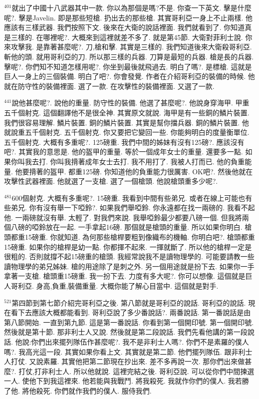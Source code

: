 \documentclass{book}
\begin{document}
$^{401}$就出了中國十八武器其中一款.
你以為那個是嗎?不是.
你查一下英文.
擊是什麼呢?.
擊是Javelin.
即是那些短槍.
扔出去的那些槍.
其實哥利亞一身上不止兩樣.
他應該有三樣武器.
我們按照下文.
後來在大衛的說話裡面.
我們就看到了.
你知道真是三樣的.
在哪裡呢?.
大概來到這裡就差不多了.
就是第45節.
大衛對菲利士說.
你來攻擊我.
是靠著甚麼呢?.
刀,槍和擊.
其實是三樣的.
我們知道後來大衛殺哥利亞.
斬他的頭.
就用哥利亞的刀.
所以那三樣的兵器.
刀算是最短的兵器.
槍是長的兵器.
擊呢?.
你們知不知道怎樣用呢?.
你坐到最後就飛過去.
明白了嗎?.
是標槍.
這就是巨人一身上的三個裝備.
明白了吧?.
你會發覺.
作者在介紹哥利亞的裝備的時候.
他就在防守性的裝備裡面.
選了一款.
在攻擊性的裝備裡面.
又選了一款.

$^{441}$說他甚麼呢?.
說他的重量.
防守性的裝備.
他選了甚麼呢?.
他說身穿海甲.
甲重五千個射克.
這個翻譯他不是很全神.
其實原文就說.
海甲是有一些銅的鱗片裝置.
我們很容易理解.
鱗片裝置.
銅的鱗片裝置.
其實是幫你擋兵器.
銅的鱗片裝置.
他就說重五千個射克.
五千個射克.
你又要把它變回一些.
你能夠明白的度量衡單位.
五千個射克.
大概有多重呢?.
125磅重.
我們中間的姊妹有沒有125磅?.
應該沒有吧?.
其實我的意思是.
他的盔甲的重量.
等於一個成年女士的重量.
還要多一點.
如果你叫我去打.
你叫我揹著成年女士去打.
我不用打了.
我被人打而已.
他的負重能量.
他要揹著的盔甲.
都重125磅.
你知道他的負重能力很厲害.
OK吧?.
然後他就在攻擊性武器裡面.
他就選了一支槍.
選了一個槍頭.
他說槍頭重多少呢?.

$^{481}$600個射克.
大概有多重呢?.
15磅重.
我看到中間有些弟兄.
或者在線上可能也有些弟兄.
你有沒有舉一下啞鈴?.
如果我們舉啞鈴.
你永遠都在找一兩磅的.
我看不起他.
一兩磅就沒有舉.
太輕了.
對我們來說.
我舉啞鈴最少都要八磅一個.
但我將兩個八磅的啞鈴放在一起.
一手拿起16磅.
那個就是槍頭的重量.
所以如果你明白.
槍頭都重15磅重.
你就知道.
為何那些槍桿要粗到像織布的機軸.
你明白吧?.
槍頭都重15磅重.
如果你的槍桿是幼一點.
你都揮不起來.
一揮就斷了.
所以他的槍桿一定是很粗的.
否則就撐不起15磅重的槍頭.
我經常說我不是讀物理學的.
可能要請教一些讀物理學的弟兄姊妹.
槍的用途除了是刺之外.
另一個用途就是扮下去.
如果你一手拿著一支槍.
槍頭重15磅重.
我一扮下去.
力度有多大呢?.
你可以想像.
這個就是巨人哥利亞.
身高,負重,裝備重量.
大概你能了解心目當中.
這個就是對手.

$^{521}$第四節到第七節介紹完哥利亞之後.
第八節就是哥利亞的說話.
哥利亞的說話.
現在看下去應該大概都能看到.
哥利亞說了多少番說話?.
兩番說話.
第一番說話是由第八節開始.
一直到第九節.
這是第一番說話.
你看到第一個開印號.
第一個開印號.
然後就是第十節.
那非利士人又說.
然後就是第二段說話.
我們先看他講的第一段說話.
他說:你們出來擺列隊伍作甚麼呢?.
我不是非利士人嗎?.
你們不是素羅的僕人嗎?.
我高光這一段.
其實如果你看上文.
其實就是第二節.
他們擺列隊伍.
跟非利士人打仗.
又說素羅.
其實他把第二節現在抄出來.
差不多再說一次.
那你們出來做甚麼?.
打仗,打非利士人.
所以他就說.
這裡完結之後.
哥利亞說.
可以從你們中間揀選一人.
使他下到我這裡來.
他若能與我戰鬥.
將我殺死.
我就作你們的僕人.
我若勝了他.
將他殺死.
你們就作我們的僕人.
服侍我們.
\end{document}
